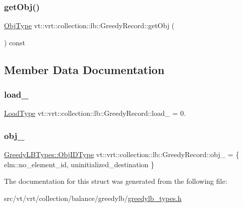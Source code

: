 \subsubsection{\texorpdfstring{get\+Obj()}{getObj()}}
{\footnotesize\ttfamily \hyperlink{structvt_1_1vrt_1_1collection_1_1lb_1_1_greedy_record_a6b0754b2434fca9e865fa8422e3d709e}{Obj\+Type} vt\+::vrt\+::collection\+::lb\+::\+Greedy\+Record\+::get\+Obj (\begin{DoxyParamCaption}{ }\end{DoxyParamCaption}) const\hspace{0.3cm}{\ttfamily [inline]}}



\subsection{Member Data Documentation}
\mbox{\label{structvt_1_1vrt_1_1collection_1_1lb_1_1_greedy_record_a77a97b5c704fc0e2e9b0c14125051d74}} 
\subsubsection{\texorpdfstring{load\+\_\+}{load\_}}
{\footnotesize\ttfamily \hyperlink{namespacevt_a8fb51741340b87d7aaee0bef60e9896b}{Load\+Type} vt\+::vrt\+::collection\+::lb\+::\+Greedy\+Record\+::load\+\_\+ = 0.\hspace{0.3cm}{\ttfamily [private]}}

\mbox{\label{structvt_1_1vrt_1_1collection_1_1lb_1_1_greedy_record_ab0e01d4431f547a017c9a4887bf5d207}} 
\subsubsection{\texorpdfstring{obj\+\_\+}{obj\_}}
{\footnotesize\ttfamily \hyperlink{structvt_1_1vrt_1_1collection_1_1lb_1_1_greedy_l_b_types_ae22670acd689e4ff83315fac2e4acb5e}{Greedy\+L\+B\+Types\+::\+Obj\+I\+D\+Type} vt\+::vrt\+::collection\+::lb\+::\+Greedy\+Record\+::obj\+\_\+ = \{ elm\+::no\+\_\+element\+\_\+id, uninitialized\+\_\+destination \}\hspace{0.3cm}{\ttfamily [private]}}



The documentation for this struct was generated from the following file\+:\begin{DoxyCompactItemize}
\item 
src/vt/vrt/collection/balance/greedylb/\hyperlink{greedylb__types_8h}{greedylb\+\_\+types.\+h}\end{DoxyCompactItemize}

